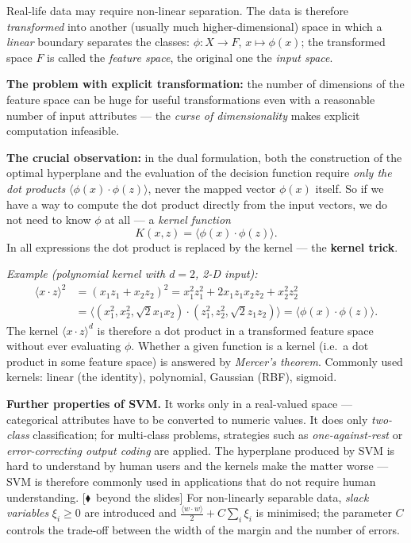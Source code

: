 \documentclass[11pt,a4paper]{article}
\theoremstyle{definition}
\newcommand{\mimo}{\textcolor{markcol}{\textsf{\footnotesize[$\blacklozenge$~beyond the slides]}}}
\begin{document}
\begin{defbox}
Real-life data may require non-linear separation. The data is therefore \emph{transformed} into
another (usually much higher-dimensional) space in which a \emph{linear} boundary separates the
classes: $\phi:X\to F$, $x\mapsto\phi(x)$; the transformed space $F$ is called the \emph{feature
space}, the original one the \emph{input space}.

\textbf{The problem with explicit transformation:} the number of dimensions of the feature space
can be huge for useful transformations even with a reasonable number of input attributes --- the
\emph{curse of dimensionality} makes explicit computation infeasible.

\textbf{The crucial observation:} in the dual formulation, both the construction of the optimal
hyperplane and the evaluation of the decision function require \emph{only the dot products}
$\langle\phi(x)\cdot\phi(z)\rangle$, never the mapped vector $\phi(x)$ itself. So if we have a way
to compute the dot product directly from the input vectors, we do not need to know $\phi$ at all
--- a \emph{kernel function}
\[ K(x,z)=\langle\phi(x)\cdot\phi(z)\rangle. \]
In all expressions the dot product is replaced by the kernel --- the \textbf{kernel trick}.

\emph{Example (polynomial kernel with $d=2$, 2-D input):}
\begin{align*}
\langle x\cdot z\rangle^2&=(x_1z_1+x_2z_2)^2=x_1^2z_1^2+2x_1z_1x_2z_2+x_2^2z_2^2\\
&=\big\langle (x_1^2,x_2^2,\sqrt2 x_1x_2)\cdot(z_1^2,z_2^2,\sqrt2 z_1z_2)\big\rangle
 =\langle\phi(x)\cdot\phi(z)\rangle.
\end{align*}
The kernel $\langle x\cdot z\rangle^d$ is therefore a dot product in a transformed feature space
without ever evaluating $\phi$. Whether a given function is a kernel (i.e.\ a dot product in some
feature space) is answered by \emph{Mercer's theorem}. Commonly used kernels: linear (the
identity), polynomial, Gaussian (RBF), sigmoid.
\end{defbox}

\textbf{Further properties of SVM.} It works only in a real-valued space --- categorical
attributes have to be converted to numeric values. It does only \emph{two-class} classification;
for multi-class problems, strategies such as \emph{one-against-rest} or \emph{error-correcting
output coding} are applied. The hyperplane produced by SVM is hard to understand by human users
and the kernels make the matter worse --- SVM is therefore commonly used in applications that do
not require human understanding. \mimo{} For non-linearly separable data, \emph{slack variables}
$\xi_i\ge 0$ are introduced and $\frac{\langle w\cdot w\rangle}{2}+C\sum_i\xi_i$ is minimised;
the parameter $C$ controls the trade-off between the width of the margin and the number of errors.
\end{document}
